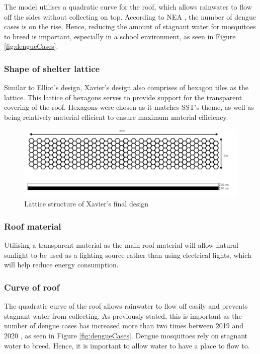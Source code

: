 \documentclass[a4paper,titlepage]{article}
\begin{document}
The model utilises a quadratic curve for the roof, which allows rainwater to flow off the sides without collecting on top. According to NEA \cite{nea-dengue}, the number of dengue cases is on the rise. Hence, reducing the amount of stagnant water for mosquitoes to breed is important, especially in a school environment, as seen in Figure \ref{fig:dengueCases}.

\subsubsection{Shape of shelter lattice}

Similar to Elliot's design, Xavier's design also comprises of hexagon tiles as the lattice. This lattice of hexagons serves to provide support for the transparent covering of the roof. Hexagons were chosen as it matches SST's theme, as well as being relatively material efficient to ensure maximum material efficiency.

\begin{figure}[htbp]
    \centering
    \includegraphics[width=\textwidth]{xavierDesign1.png}
    \caption{Lattice structure of Xavier's final design}
    \label{fig:xavierDesign1}
\end{figure}
\subsubsection{Roof material}

Utilising a transparent material as the main roof material will allow natural sunlight to be used as a lighting source rather than using electrical lights, which will help reduce energy consumption.

\subsubsection{Curve of roof}

The quadratic curve of the roof allows rainwater to flow off easily and prevents stagnant water from collecting. As previously stated, this is important as the number of dengue cases has increased more than two times between 2019 and 2020 \cite{nea-dengue}, as seen in Figure \ref{fig:dengueCases}. Dengue mosquitoes rely on stagnant water to breed. Hence, it is important to allow water to have a place to flow to.
\end{document}
